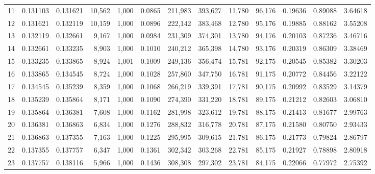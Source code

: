 \begin{tabular}{rrrrrrrrrrrrr}
11  &  0.131103 &  0.131621 &  10,562 &  1,000 &                                     0.0865 &  211,983 &  393,627 &   11,780 &   96,176 &  0.19636 &  0.89088 &  3.64618 \\
12  &  0.131621 &  0.132119 &  10,159 &  1,000 &                                     0.0896 &  222,142 &  383,468 &   12,780 &   95,176 &  0.19885 &  0.88162 &  3.55208 \\
13  &  0.132119 &  0.132661 &   9,167 &  1,000 &                                     0.0984 &  231,309 &  374,301 &   13,780 &   94,176 &  0.20103 &  0.87236 &  3.46716 \\
14  &  0.132661 &  0.133235 &   8,903 &  1,000 &                                     0.1010 &  240,212 &  365,398 &   14,780 &   93,176 &  0.20319 &  0.86309 &  3.38469 \\
15  &  0.133235 &  0.133865 &   8,924 &  1,001 &                                     0.1009 &  249,136 &  356,474 &   15,781 &   92,175 &  0.20545 &  0.85382 &  3.30203 \\
16  &  0.133865 &  0.134545 &   8,724 &  1,000 &                                     0.1028 &  257,860 &  347,750 &   16,781 &   91,175 &  0.20772 &  0.84456 &  3.22122 \\
17  &  0.134545 &  0.135239 &   8,359 &  1,000 &                                     0.1068 &  266,219 &  339,391 &   17,781 &   90,175 &  0.20992 &  0.83529 &  3.14379 \\
18  &  0.135239 &  0.135864 &   8,171 &  1,000 &                                     0.1090 &  274,390 &  331,220 &   18,781 &   89,175 &  0.21212 &  0.82603 &  3.06810 \\
19  &  0.135864 &  0.136381 &   7,608 &  1,000 &                                     0.1162 &  281,998 &  323,612 &   19,781 &   88,175 &  0.21413 &  0.81677 &  2.99763 \\
20  &  0.136381 &  0.136863 &   6,834 &  1,000 &                                     0.1276 &  288,832 &  316,778 &   20,781 &   87,175 &  0.21580 &  0.80750 &  2.93433 \\
21  &  0.136863 &  0.137355 &   7,163 &  1,000 &                                     0.1225 &  295,995 &  309,615 &   21,781 &   86,175 &  0.21773 &  0.79824 &  2.86797 \\
22  &  0.137355 &  0.137757 &   6,347 &  1,000 &                                     0.1361 &  302,342 &  303,268 &   22,781 &   85,175 &  0.21927 &  0.78898 &  2.80918 \\
23  &  0.137757 &  0.138116 &   5,966 &  1,000 &                                     0.1436 &  308,308 &  297,302 &   23,781 &   84,175 &  0.22066 &  0.77972 &  2.75392 \\

\end{tabular}
